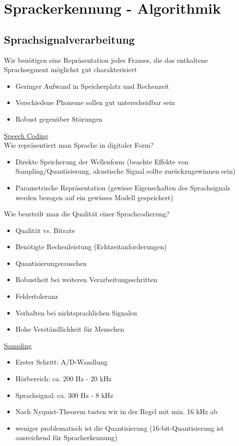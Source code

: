 \documentclass[a4paper,10pt,oneside]{article}
\begin{document}
\section{Sprackerkennung - Algorithmik}
\subsection{Sprachsignalverarbeitung}
Wir benötigen eine Repräsentation jedes Frames, die das enthaltene Sprachsegment möglichst gut charakterisiert
	\begin{itemize}
		\item Geringer Aufwand in Speicherplatz und Rechenzeit
		\item Verschiedene Phoneme sollen gut unterscheidbar sein
		\item Robust gegenüber Störungen 
	\end{itemize}

\underline{Speech Coding} \\
Wie repräsentiert man Sprache in digitaler Form?
	\begin{itemize}
		\item Direkte Speicherung der Wellenform (beachte Effekte von Sampling/Quantisierung, akustische Signal sollte zurückzugewinnen sein)
		\item Parametrische Repräsentation (gewisse Eigenschaften des Sprachsignals werden bezogen auf ein gewisses Modell gespeichert)
	\end{itemize}

Wie beurteilt man die Qualität einer Sprachcodierung?
	\begin{itemize}
		\item Qualität vs. Bitrate
		\item Benötigte Rechenleistung (Echtzeitanforderungen)
		\item Quantisierungsrauschen
		\item Robustheit bei weiteren Verarbeitungsschritten
		\item Fehlertoleranz
		\item Verhalten bei nichtsprachlichen Signalen
		\item Hohe Verständlichkeit für Menschen
	\end{itemize}
	
\underline{Sampling} \\
	\begin{itemize}
		\item Erster Schritt: A/D-Wandlung
		\item Hörbereich: ca. 200 Hz - 20 kHz
		\item Sprachsignal: ca. 300 Hz - 8 kHz
		\item Nach Nyquist-Theorem tasten wir in der Regel mit min. 16 kHz ab
		\item weniger problematisch ist die Quantisierung (16-bit-Quantisierung ist ausreichend für Spracherkennung)
	\end{itemize}
	
\end{document}
